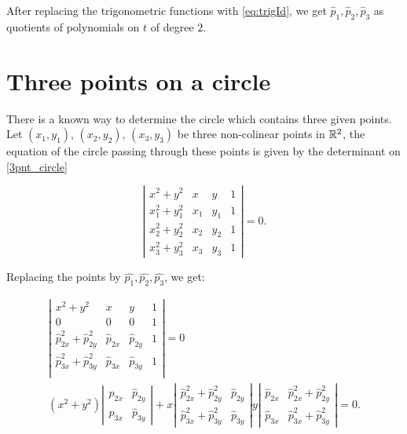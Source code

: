 After replacing the trigonometric functions with \autoref{eq:trigId}, we get $\hat{p}_1, \hat{p}_2, \hat{p}_3$ as quotients of polynomials on $t$ of degree $2$.

\section{Three points on a circle}
There is a known way to determine the circle which contains three given points. 
Let $(x_1, y_1)$, $(x_2, y_2)$, $(x_3, y_3)$ be three non-colinear points in $\mathbb{R}^2$, the equation of the circle passing through these points is given by the determinant on \autoref{3pnt_circle}

\begin{equation}\label{3pnt_circle}
\left|
\begin{array}{cccc}
x^2+y^2&x&y&1\\
x_1^2+y_1^2&x_1&y_1&1\\
x_2^2+y_2^2&x_2&y_2&1\\
x_3^2+y_3^2&x_3&y_3&1
\end{array}
\right| = 0.
\end{equation}

Replacing the points by $\hat{p_1}, \hat{p_2}, \hat{p_3}$, we get:

\begin{eqnarray*}
\left|
\begin{array}{cccc}
x^2+y^2&x&y&1\\
0&0&0&1\\
\hat{p}_{2x}^2+\hat{p}_{2y}^2&\hat{p}_{2x}&\hat{p}_{2y}&1\\
\hat{p}_{3x}^2+\hat{p}_{3y}^2&\hat{p}_{3x}&\hat{p}_{3y}&1\\
\end{array}
\right| = 0\\
(x^2+y^2)\left|
\begin{array}{cc}
\hat{p}_{2x}& \hat{p}_{2y}\\
\hat{p}_{3x}& \hat{p}_{3y}
\end{array}\right|
+
x\left|
\begin{array}{cc}
	\hat{p}_{2x}^2+\hat{p}_{2y}^2& \hat{p}_{2y}\\
	\hat{p}_{3x}^2+\hat{p}_{3y}^2& \hat{p}_{3y}
\end{array}\right|
y\left|
\begin{array}{cc}
	\hat{p}_{2x}& \hat{p}_{2x}^2+\hat{p}_{2y}^2\\
	\hat{p}_{3x}& \hat{p}_{3x}^2+\hat{p}_{3y}^2
\end{array}\right|=0.
\end{eqnarray*}

